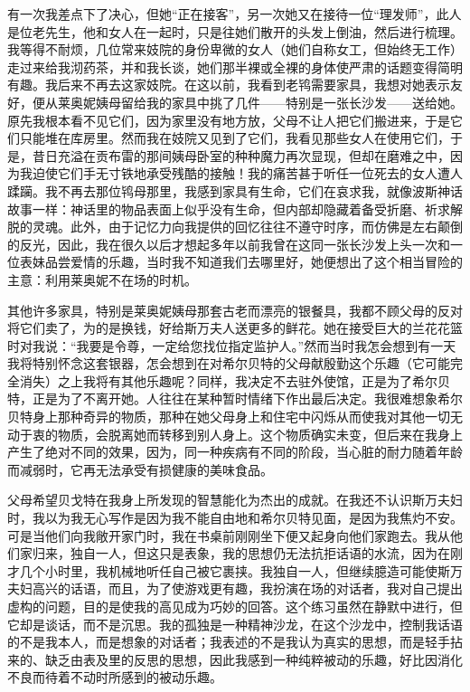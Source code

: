 \par 有一次我差点下了决心，但她“正在接客”，另一次她又在接待一位“理发师”，此人是位老先生，他和女人在一起时，只是往她们散开的头发上倒油，然后进行梳理。我等得不耐烦，几位常来妓院的身份卑微的女人（她们自称女工，但始终无工作）走过来给我沏药茶，并和我长谈，她们那半裸或全裸的身体使严肃的话题变得简明有趣。我后来不再去这家妓院。在这以前，我看到老鸨需要家具，我想对她表示友好，便从莱奥妮姨母留给我的家具中挑了几件——特别是一张长沙发——送给她。原先我根本看不见它们，因为家里没有地方放，父母不让人把它们搬进来，于是它们只能堆在库房里。然而我在妓院又见到了它们，我看见那些女人在使用它们，于是，昔日充溢在贡布雷的那间姨母卧室的种种魔力再次显现，但却在磨难之中，因为我迫使它们手无寸铁地承受残酷的接触！我的痛苦甚于听任一位死去的女人遭人蹂躏。我不再去那位鸨母那里，我感到家具有生命，它们在哀求我，就像波斯神话故事一样：神话里的物品表面上似乎没有生命，但内部却隐藏着备受折磨、祈求解脱的灵魂。此外，由于记忆力向我提供的回忆往往不遵守时序，而仿佛是左右颠倒的反光，因此，我在很久以后才想起多年以前我曾在这同一张长沙发上头一次和一位表妹品尝爱情的乐趣，当时我不知道我们去哪里好，她便想出了这个相当冒险的主意：利用莱奥妮不在场的时机。
\par 其他许多家具，特别是莱奥妮姨母那套古老而漂亮的银餐具，我都不顾父母的反对将它们卖了，为的是换钱，好给斯万夫人送更多的鲜花。她在接受巨大的兰花花篮时对我说：“我要是令尊，一定给您找位指定监护人。”然而当时我怎会想到有一天我将特别怀念这套银器，怎会想到在对希尔贝特的父母献殷勤这个乐趣（它可能完全消失）之上我将有其他乐趣呢？同样，我决定不去驻外使馆，正是为了希尔贝特，正是为了不离开她。人往往在某种暂时情绪下作出最后决定。我很难想象希尔贝特身上那种奇异的物质，那种在她父母身上和住宅中闪烁从而使我对其他一切无动于衷的物质，会脱离她而转移到别人身上。这个物质确实未变，但后来在我身上产生了绝对不同的效果，因为，同一种疾病有不同的阶段，当心脏的耐力随着年龄而减弱时，它再无法承受有损健康的美味食品。
\par 父母希望贝戈特在我身上所发现的智慧能化为杰出的成就。在我还不认识斯万夫妇时，我以为我无心写作是因为我不能自由地和希尔贝特见面，是因为我焦灼不安。可是当他们向我敞开家门时，我在书桌前刚刚坐下便又起身向他们家跑去。我从他们家归来，独自一人，但这只是表象，我的思想仍无法抗拒话语的水流，因为在刚才几个小时里，我机械地听任自己被它裹挟。我独自一人，但继续臆造可能使斯万夫妇高兴的话语，而且，为了使游戏更有趣，我扮演在场的对话者，我对自己提出虚构的问题，目的是使我的高见成为巧妙的回答。这个练习虽然在静默中进行，但它却是谈话，而不是沉思。我的孤独是一种精神沙龙，在这个沙龙中，控制我话语的不是我本人，而是想象的对话者；我表述的不是我认为真实的思想，而是轻手拈来的、缺乏由表及里的反思的思想，因此我感到一种纯粹被动的乐趣，好比因消化不良而待着不动时所感到的被动乐趣。
